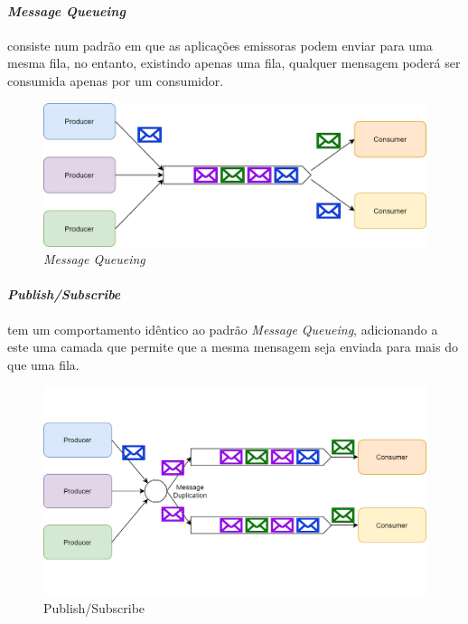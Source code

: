 \paragraph{\emph{Message Queueing}} \label{message_queueing} consiste num padrão em que as aplicações emissoras podem enviar para uma mesma fila, no entanto, existindo  apenas uma fila, qualquer mensagem poderá ser consumida apenas por um consumidor.

\begin{figure}[H]
    \begin{center}
    \includegraphics[width=1\textwidth]{figures/message_queueing.png}
    \caption{\emph{Message Queueing}}
    \end{center}
\end{figure}

\paragraph{\emph{Publish/Subscribe}} \label{publish_subscribe} tem um comportamento idêntico ao padrão \emph{Message Queueing}, adicionando a este uma camada que permite que a mesma mensagem seja enviada para mais do que uma fila.

\begin{figure}[H]
    \begin{center}
    \includegraphics[width=1\textwidth]{figures/pub_sub.png}
    \caption{Publish/Subscribe}
    \end{center}
\end{figure}


